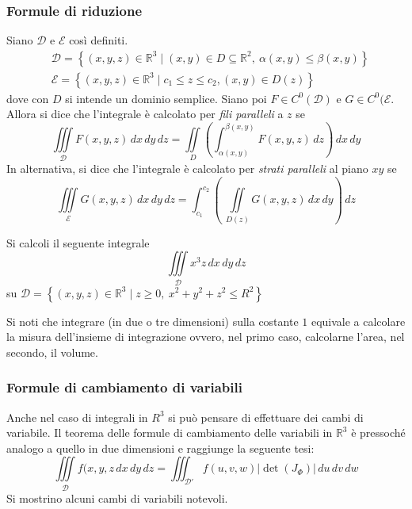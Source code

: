 \subsubsection{Formule di riduzione}
Siano $\mathcal{D}$ e $\mathcal{E}$ così definiti.
\begin{align}
    &\mathcal{D}=\left\{(x,y,z) \in \mathbb{R}^3 \mid (x,y) \in D \subseteq \mathbb{R}^2,\ \alpha(x, y) \leq \beta(x,y) \right\}\\
    &\mathcal{E}= \left\{(x,y,z) \in \mathbb{R}^3 \mid c_1\leq z \leq c_2, (x,y) \in D(z)\right\}
\end{align}
dove con $D$ si intende un dominio semplice. Siano poi $F \in C^0(\mathcal{D})$ e $G \in C^0(\mathcal{E}$.
Allora si dice che l'integrale è calcolato per \textit{fili paralleli} a $z$ se
\begin{equation}
    \iiint\limits_{\mathcal{D}} F(x,y,z)\, dx\, dy\,dz= \iint\limits_{D}{\left(\int_{\alpha(x,y)}^{\beta(x,y)}{F(x,y,z)\, dz}\right)}\,dx\, dy
\end{equation}
In alternativa, si dice che l'integrale è calcolato per \textit{strati paralleli} al piano $xy$ se
\begin{equation}
\iiint\limits_{\mathcal{E}}{G(x,y,z)\, dx\,dy\,dz} = \int_{c_1}^{c_2}{\left(\ \iint\limits_{D(z)}{G(x,y,z) \, dx\,dy} \right)\, dz}
\end{equation}
\begin{example}[TO-DO]
    Si calcoli il seguente integrale
    \begin{equation*}
    \iiint\limits_{\mathcal{D}}{x^3z}\,dx\,dy\,dz
    \end{equation*}
    su $\mathcal{D}= \left\{(x,y,z) \in \mathbb{R}^3 \mid z \geq 0,\ x^2+y^2+z^2\leq R^2\right\}$
\end{example}
\begin{oss}    
Si noti che integrare (in due o tre dimensioni) sulla costante $1$ equivale a calcolare la misura dell'insieme di integrazione ovvero, nel primo caso, calcolarne l'area, nel secondo, il volume.
\end{oss}
\subsubsection{Formule di cambiamento di variabili}
Anche nel caso di integrali in $R^3$ si può pensare di effettuare dei cambi di variabile. Il teorema delle formule di cambiamento delle variabili in $\mathbb{R}^3$ è pressoché analogo a quello in due dimensioni e raggiunge la seguente tesi:
\begin{equation}
    \iiint\limits_{\mathcal{D}}{f(x,y,z}\,dx\,dy\,dz=\iiint_{\mathcal{D}'}{f(u,v,w)|\det(J_\Phi)|}\,du\,dv\,dw
\end{equation}
Si mostrino alcuni cambi di variabili notevoli.

